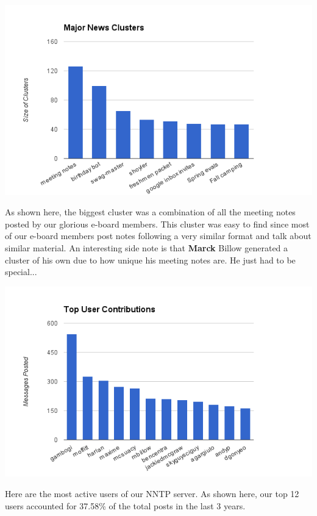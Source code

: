 \documentclass[9pt]{extarticle} %
\begin{document}
\begin{multicols}{2}

\centerline{\includegraphics[width=\linewidth]{imgs/2016-02-15-clusters.png}}

As shown here, the biggest cluster was a combination of all the meeting notes posted by our glorious e-board members. This cluster was easy to find since most of our e-board members post notes following a very similar format and talk about similar material. An interesting side note is that \textbf{Marck} Billow generated a cluster of his own due to how unique his meeting notes are. He just had to be special...

\centerline{\includegraphics[width=\linewidth]{imgs/2016-02-15-users.png}}

Here are the most active users of our NNTP server. As shown here, our top 12 users accounted for 37.58\% of the total posts in the last 3 years. \\
\\



\end{multicols}
\end{document}
